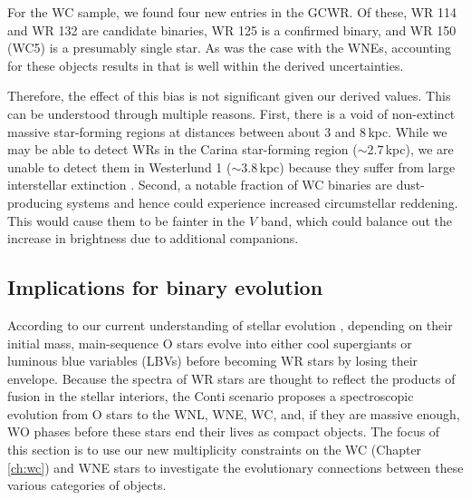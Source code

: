 For the WC sample, we found four new entries in the GCWR. Of these, WR 114 \citep[WC5\,+\,OB?:][]{2001vanderHucht} and WR 132 \citep[WC6\,+\,?:][]{1983BisiacchiWR132} are candidate binaries, WR 125 \citep[WC7ed\,+\,O9III:][]{2019WilliamsNEOWISE,2021AroraWR125} is a confirmed binary, and WR 150 (WC5) is a presumably single star. As was the case with the WNEs, accounting for these objects results in \fintWC{} that is well within the derived uncertainties.

Therefore, the effect of this bias is not significant given our derived values. This can be understood through multiple reasons. First, there is a void of non-extinct massive star-forming regions at distances between about 3 and 8\,kpc. While we may be able to detect WRs in the Carina star-forming region (${\sim}$2.7\,kpc), we are unable to detect them in Westerlund 1 (${\sim}$3.8\,kpc) because they suffer from large interstellar extinction \citep{2005Clark}. Second, a notable fraction of WC binaries are dust-producing systems \citep{1995Williamsdust} and hence could experience increased circumstellar reddening. This would cause them to be fainter in the $V$ band, which could balance out the increase in brightness due to additional companions.

\subsection{Implications for binary evolution}

According to our current understanding of stellar evolution \citep{1976Conti,2003MeynetMaeder,2007Crowther}, depending on their initial mass, main-sequence O stars evolve into either cool supergiants or luminous blue variables (LBVs) before becoming WR stars by losing their envelope. Because the spectra of WR stars are thought to reflect the products of fusion in the stellar interiors, the Conti scenario \citep{1976Conti,2007Crowther} proposes a spectroscopic evolution from O stars to the WNL, WNE, WC, and, if they are massive enough, WO phases before these stars end their lives as compact objects. The focus of this section is to use our new multiplicity constraints on the WC (Chapter \ref{ch:wc}) and WNE stars to investigate the evolutionary connections between these various categories of objects.


